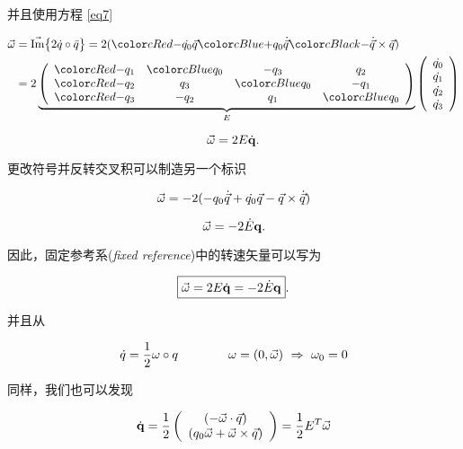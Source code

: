 并且使用方程 \eqref{eq7}

\begin{align*}
\vec{\w} &= \IM\big\{{2 \dot{q} \o \bar{q}} \big\} = 2(\Red{-\dot{q_0}\vec{q}} \Blue{ + q_0\dot{\vec{q}}} \Black{- \dot{\vec{q}} \c \vec{q})} \\
         &= 2 \underbrace{\left( \begin{array}{cccc}
\Red{-q_1} &  \Blue{q_0} & -q_3 & q_2 \\
\Red{-q_2} &  q_3 & \Blue{q_0}  & -q_1 \\
\Red{-q_3} & -q_2 & q_1  & \Blue{q_0} \\
\end{array} \right)}_{E} \left( \begin{array}{c}
\dot{q_0} \\
\dot{q_1} \\
\dot{q_2} \\
\dot{q_3} \\
\end{array} \right)
\end{align*}

\begin{equation*}
\vec{\omega} = 2E\dot{\mathbf{q}} .
\end{equation*}

更改符号并反转交叉积可以制造另一个标识

\begin{equation*}
\vec{\omega} = -2(-q_0\dot{\vec{q}} + \dot{q_0}\vec{q} - \vec{q} \times \dot{\vec{q}}) 
\end{equation*}

\begin{equation*}
\vec{\omega} = -2\dot{E}\mathbf{q} .
\end{equation*}

因此，固定参考系(\emph{fixed reference})中的转速矢量可以写为

\begin{equation}
\fbox{$ \vec{\omega} = 2E\dot{\mathbf{q}} = -2\dot{E}\mathbf{q} $} .
\end{equation}


并且从

\begin{equation*}
\dot{q} = \frac{1}{2} \omega \circ q     \qquad \qquad  \omega = (0,\vec{\omega}) \ \Rightarrow \ \omega_0=0
\end{equation*}

同样，我们也可以发现

\begin{equation*}
\dot{\mathbf{q}} = \frac{1}{2} \left( \begin{array}{c}
(-\vec{\omega} \cdot \vec{q})\\
(q_0\vec{\omega} + \vec{\omega} \times \vec{q})
\end{array} \right) = \frac{1}{2} E^T\vec{\omega}
\end{equation*}

